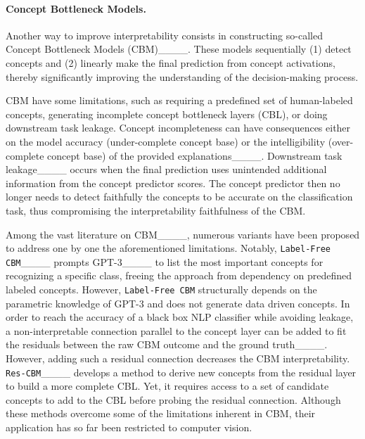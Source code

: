\paragraph{Concept Bottleneck Models.}

Another way to improve interpretability
consists in constructing 
so-called Concept Bottleneck Models (CBM)____. 
These models sequentially (1) detect concepts and (2) linearly make the final prediction from concept activations, thereby significantly improving the understanding of the decision-making process. 

CBM have some limitations, such as requiring a predefined set of human-labeled concepts, generating incomplete concept bottleneck layers (CBL), or doing downstream task leakage. Concept incompleteness can have consequences either on the model accuracy (under-complete concept base) or the intelligibility (over-complete concept base) of the provided explanations____. Downstream task leakage____ occurs when the final prediction uses unintended additional information from the concept predictor scores. 
The concept predictor then no longer needs to  detect faithfully the concepts to be accurate on the classification task, thus compromising the interpretability faithfulness of the CBM. 

Among the vast literature on CBM____, numerous variants have been proposed to address one by one the aforementioned limitations. Notably, \texttt{Label-Free CBM}____ prompts GPT-3____ to list the most important concepts for recognizing a specific class, freeing the approach from dependency on predefined labeled concepts. However, \texttt{Label-Free CBM} structurally depends on the parametric knowledge of GPT-3 and does not generate data driven concepts. In order to reach the accuracy of a black box NLP classifier while avoiding leakage, a non-interpretable connection parallel to the concept layer can be added to fit the residuals between the raw CBM outcome and the ground truth____. However, adding such a residual connection decreases the CBM interpretability. \texttt{Res-CBM}____ develops a method to derive new concepts from the residual layer to build a more complete CBL. Yet, it 
requires access to a set of candidate concepts to add to the CBL before probing the residual connection. Although these methods overcome some of the limitations inherent in CBM, their application has so far been restricted to computer vision. 



